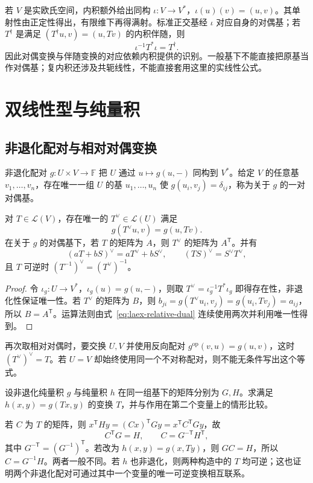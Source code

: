 若 $V$ 是实欧氏空间，内积额外给出同构 $\iota:V\to V^*$，$\iota(u)(v)=(u,v)$。其单射性由正定性得出，有限维下再得满射。标准正交基经 $\iota$ 对应自身的对偶基；若 $T^\dagger$ 是满足 $(T^\dagger u,v)=(u,Tv)$ 的内积伴随，则
\[
 \iota^{-1}T^*\iota=T^\dagger.
\]
因此对偶变换与伴随变换的对应依赖内积提供的识别。一般基下不能直接把原基当作对偶基；复内积还涉及共轭线性，不能直接套用这里的实线性公式。

\section{双线性型与纯量积}
\label{sec:laex-bilinear-methods}

\subsection{非退化配对与相对对偶变换}

非退化配对 $g:U\times V\to\mathbb F$ 把 $U$ 通过 $u\mapsto g(u,-)$ 同构到 $V^*$。给定 $V$ 的任意基 $v_1,\ldots,v_n$，存在唯一一组 $U$ 的基 $u_1,\ldots,u_n$ 使 $g(u_i,v_j)=\delta_{ij}$，称为关于 $g$ 的一对对偶基。

\begin{proposition}
\label{prop:laex-relative-dual}
对 $T\in\mathcal L(V)$，存在唯一的 $T^\vee\in\mathcal L(U)$ 满足
\begin{equation}
 g(T^\vee u,v)=g(u,Tv).
 \label{eq:laex-relative-dual}
\end{equation}
在关于 $g$ 的对偶基下，若 $T$ 的矩阵为 $A$，则 $T^\vee$ 的矩阵为 $A^{\mathsf T}$。并有
\[
 (aT+bS)^\vee=aT^\vee+bS^\vee,\qquad
 (TS)^\vee=S^\vee T^\vee,
\]
且 $T$ 可逆时 $(T^{-1})^\vee=(T^\vee)^{-1}$。
\end{proposition}
\begin{proof}
令 $\iota_g:U\to V^*$，$\iota_g(u)=g(u,-)$，则取 $T^\vee=\iota_g^{-1}T^*\iota_g$ 即得存在性，非退化性保证唯一性。若 $T^\vee$ 的矩阵为 $B$，则 $b_{ji}=g(T^\vee u_i,v_j)=g(u_i,Tv_j)=a_{ij}$，所以 $B=A^{\mathsf T}$。运算法则由式~\eqref{eq:laex-relative-dual} 连续使用两次并利用唯一性得到。
\end{proof}

再次取相对对偶时，要交换 $U,V$ 并使用反向配对 $g^{\mathrm{op}}(v,u)=g(u,v)$，这时 $(T^\vee)^\vee=T$。若 $U=V$ 却始终使用同一个不对称配对，则不能无条件写出这个等式。

\begin{example}
\label{ex:laex-form-operator-matrix}
设非退化纯量积 $g$ 与纯量积 $h$ 在同一组基下的矩阵分别为 $G,H$。求满足 $h(x,y)=g(Tx,y)$ 的变换 $T$，并与作用在第二个变量上的情形比较。
\end{example}
\begin{solve}
若 $C$ 为 $T$ 的矩阵，则 $x^{\mathsf T}Hy=(Cx)^{\mathsf T}Gy=x^{\mathsf T}C^{\mathsf T}Gy$，故
\begin{equation}
 C^{\mathsf T}G=H,\qquad C=G^{-\mathsf T}H^{\mathsf T},
 \label{eq:laex-left-form-operator}
\end{equation}
其中 $G^{-\mathsf T}=(G^{-1})^{\mathsf T}$。若改为 $h(x,y)=g(x,Ty)$，则 $GC=H$，所以 $C=G^{-1}H$。两者一般不同。若 $h$ 也非退化，则两种构造中的 $T$ 均可逆；这也证明两个非退化配对可通过其中一个变量的唯一可逆变换相互联系。
\end{solve}

